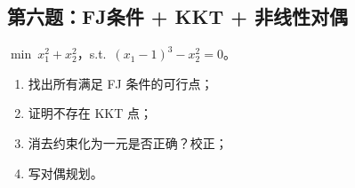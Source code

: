 \subsection*{第六题：FJ条件 + KKT + 非线性对偶}

\noindent $\min\ x_1^2 + x_2^2$，s.t.\ $(x_1-1)^3 - x_2^2 = 0$。
\begin{enumerate}
  \item[(1)] 找出所有满足 FJ 条件的可行点；
  \item[(2)] 证明不存在 KKT 点；
  \item[(3)] 消去约束化为一元是否正确？校正；
  \item[(4)] 写对偶规划。
\end{enumerate}


